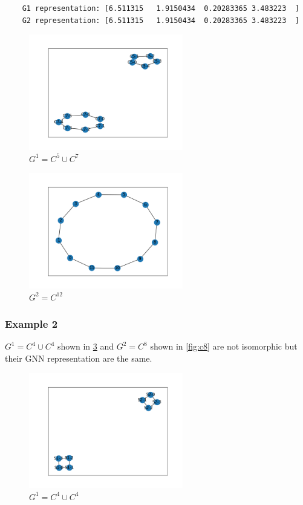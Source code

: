 \documentclass[a4paper]{article}
\begin{document}
\begin{verbatim}
    G1 representation: [6.511315   1.9150434  0.20283365 3.483223  ]
    G2 representation: [6.511315   1.9150434  0.20283365 3.483223  ]
\end{verbatim}

\begin{figure}[ht]
    \centering
    \includegraphics[width=0.6\textwidth]{figures/c5_u_c7.png}
    \caption{$G^1 =C^5 \cup C^7$}
    \label{fig:c5_u_c7}
\end{figure}

\begin{figure}[ht]
    \centering
    \includegraphics[width=0.6\textwidth]{figures/c12.png}
    \caption{$G^2 =C^{12}$}
    \label{fig:c12}
\end{figure}
\break
\subsubsection*{Example 2}
$G^1 =C^4 \cup C^4$ shown in \ref{fig:c4_u_c4} and $G^2 =C^8$ shown in \ref{fig:c8} are not isomorphic but their GNN representation are the same.
\begin{figure}[ht]
    \centering
    \includegraphics[width=0.6\textwidth]{figures/C4_u_C4.png}
    \caption{$G^1 =C^4 \cup C^4$}
    \label{fig:c4_u_c4}
\end{figure}
\end{document}

